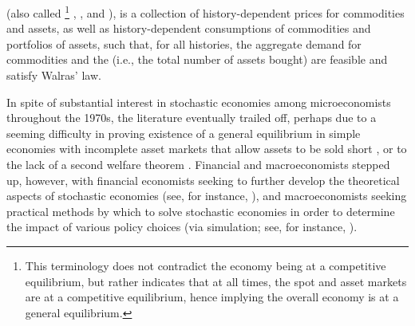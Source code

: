 (also called %
\footnote{This terminology does not contradict the economy being at a competitive equilibrium, but rather indicates that at all times, the spot and asset markets are at a competitive equilibrium, hence implying the overall economy is at a general equilibrium.} 
\cite{mas-colell},  \cite{radner1979rational}, and  \cite{geanakoplos1990introduction}), is a collection of history-dependent prices for commodities and assets, as well as history-dependent consumptions of commodities and portfolios of assets, such that, for all histories, the aggregate demand for commodities and the  (i.e., the total number of assets bought) are feasible and satisfy Walras' law.

In spite of substantial interest in stochastic economies among microeconomists throughout the 1970s, the literature eventually trailed off, 
perhaps due to a seeming difficulty in proving existence of a general equilibrium in simple economies with incomplete asset markets that allow assets to be sold short \cite{geanakoplos1990introduction}, or to the lack of a second welfare theorem \cite{dreze1974investment, hart1975optimality}.
Financial and macroeconomists stepped up, however, with financial economists seeking to further develop the theoretical aspects of stochastic economies (see, for instance, \citet{magill2002theory}), and macroeconomists seeking practical methods by which to solve stochastic economies in order to determine the impact of various policy choices (via simulation; see, for instance, \citet{sargent2000recursive}).


